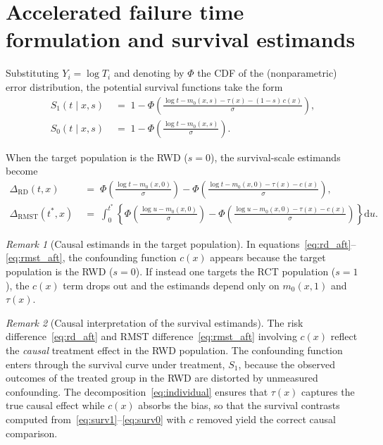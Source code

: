 \documentclass[10pt]{article}
\theoremstyle{plain}
\theoremstyle{definition}
\theoremstyle{remark}
\newtheorem{remark}{Remark}
\newcommand{\CATE}{\tau}
\newcommand{\cf}{c}
\begin{document}
\section{Accelerated failure time formulation and survival estimands}

Substituting $Y_i = \log T_i$ and denoting by $\Phi$ the CDF of the (nonparametric) error distribution, the potential survival functions take the form
\begin{align}
  S_1(t \mid x, s) &\;=\; 1 - \Phi\!\left(\frac{\log t - m_0(x,s) - \CATE(x) - (1-s)\,\cf(x)}{\sigma}\right), \label{eq:surv1}\\[4pt]
  S_0(t \mid x, s) &\;=\; 1 - \Phi\!\left(\frac{\log t - m_0(x,s)}{\sigma}\right). \label{eq:surv0}
\end{align}

\noindent When the target population is the RWD ($s = 0$), the survival-scale estimands become
\begin{align}
  \Delta_{\mathrm{RD}}(t, x) 
  &\;=\; \Phi\!\left(\frac{\log t - m_0(x, 0)}{\sigma}\right) 
  - \Phi\!\left(\frac{\log t - m_0(x,0) - \CATE(x) - \cf(x)}{\sigma}\right), \label{eq:rd_aft}\\[6pt]
  \Delta_{\mathrm{RMST}}(t^*, x)
  &\;=\; \int_0^{t^*}\left\{
  \Phi\!\left(\frac{\log u - m_0(x,0)}{\sigma}\right) 
  - \Phi\!\left(\frac{\log u - m_0(x,0) - \CATE(x) - \cf(x)}{\sigma}\right)
  \right\}\mathrm{d}u. \label{eq:rmst_aft}
\end{align}

\begin{remark}[Causal estimands in the target population]
  In equations~\eqref{eq:rd_aft}--\eqref{eq:rmst_aft}, the confounding function $\cf(x)$ appears because the target population is the RWD ($s=0$). If instead one targets the RCT population ($s=1$), the $\cf(x)$ term drops out and the estimands depend only on $m_0(x,1)$ and $\CATE(x)$.
\end{remark}

\begin{remark}[Causal interpretation of the survival estimands]
  The risk difference~\eqref{eq:rd_aft} and RMST difference~\eqref{eq:rmst_aft} involving $\cf(x)$ reflect the \emph{causal} treatment effect in the RWD population. The confounding function enters through the survival curve under treatment, $S_1$, because the observed outcomes of the treated group in the RWD are distorted by unmeasured confounding. The decomposition~\eqref{eq:individual} ensures that $\CATE(x)$ captures the true causal effect while $\cf(x)$ absorbs the bias, so that the survival contrasts computed from~\eqref{eq:surv1}--\eqref{eq:surv0} with $\cf$ removed yield the correct causal comparison.
\end{remark}
\end{document}
